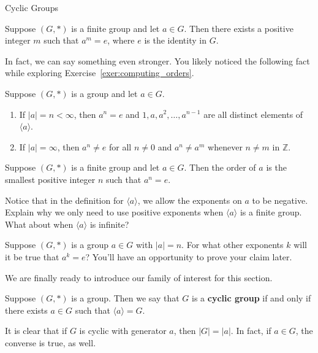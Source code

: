 \begin{section}{Cyclic Groups}
\begin{theorem}
Suppose $(G,*)$ is a finite group and let $a\in G$.  Then there exists a positive integer $m$ such that $a^m=e$, where $e$ is the identity in $G$. 
\end{theorem}

In fact, we can say something even stronger.  You likely noticed the following fact while exploring Exercise~\ref{exer:computing_orders}.

\begin{theorem}
Suppose $(G,*)$ is a group and let $a\in G$.
\begin{enumerate}[label=\rm{(\alph*)}]
\item If $|a|=n<\infty$, then $a^n=e$ and $1,a,a^2,\ldots, a^{n-1}$ are all distinct elements of $\langle a\rangle$.
\item If $|a|=\infty$, then $a^n\neq e$ for all $n\neq 0$ and $a^n\neq a^m$ whenever $n\neq m$ in $\mathbb{Z}$.
\end{enumerate}
\end{theorem}

\begin{corollary}
Suppose $(G,*)$ is a finite group and let $a\in G$.  Then the order of $a$ is the smallest positive integer $n$ such that $a^n=e$.
\end{corollary}

\begin{exercise}\label{exer:finite_pos_exps}
Notice that in the definition for $\langle a\rangle$, we allow the exponents on $a$ to be negative.  Explain why we only need to use positive exponents when $\langle a\rangle$ is a finite group.  What about when $\langle a\rangle$ is infinite?
\end{exercise}

\begin{problem}\label{prob:MultiplesOfOrder}
Suppose $(G,*)$ is a group $a\in G$ with $|a|=n$.  For what other exponents $k$ will it be true that $a^k=e$? You'll have an opportunity to prove your claim later.
\end{problem}

We are finally ready to introduce our family of interest for this section.

\begin{definition}
Suppose $(G,*)$ is a group.  Then we say that $G$ is a \textbf{cyclic group} if and only if there exists $a\in G$ such that $\langle a\rangle =G$.
\end{definition}

It is clear that if $G$ is cyclic with generator $a$, then $|G|=|a|$.  In fact, if $a\in G$, the converse is true, as well.


\end{section}
